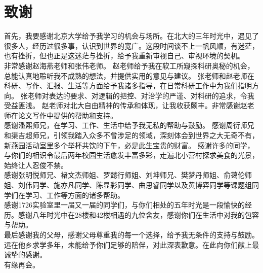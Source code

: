 
\chapter{致谢}
首先，我要感谢北京大学给予我学习的机会与场所。在北大的三年时光中，遇见了很多人，经历过很多事，认识到世界的宽广。这段时间谈不上一帆风顺，有迷茫，也有挫折，但也正是这迷茫与挫折，给予我重新审视自己、审视环境的契机。\\
\indent 非常感谢赵海燕老师和张伟老师。
赵老师给予我在软工所窥探科研奥秘的机会，总能认真地聆听我不成熟的想法，并提供实用的意见与建议。
张老师和赵老师在科研、写作、汇报、生活等方面给予我诸多指导，在日常科研工作中为我们指明方向。
张老师对表达的要求、对逻辑的把控、对治学的严谨、对科研的追求，令我受益匪浅。
赵老师对北大自由精神的传承和体现，让我收获颇丰。非常感谢赵老师在论文写作中提供的帮助和支持。\\
\indent 感谢潘熙师兄，在学习、工作、生活中给予我无私的帮助与鼓励。
感谢周衍师兄和渠吉超师兄，引领我踏入众多不曾涉足的领域，深刻体会到世界之大无奇不有，新燕园活动室里多个举杯共饮的下午，必是此生宝贵的财富。
感谢许多的同学，与你们的相识令最后两年校园生活愈发丰富多彩，走遍北小营村探求美食的光景，始终让人忍俊不禁。\\
\indent 感谢张明悦师兄、褚文杰师姐、罗懿行师姐、刘坤师兄、樊梦丹师姐、俞蔼伦师姐、刘伟同学、施亦凡同学、陈显彩同学、曲思睿同学以及黄博弈同学等课题组同学们在学习、工作等方面的诸多帮助。\\
\indent 感谢1726实验室里一届又一届的同学们，与你们相处的五年时光是一段愉快的经历。感谢八年时光中在28楼和42楼相遇的九位舍友，感谢你们在生活中对我的包容与帮助。\\
\indent 最后感谢我的父母，感谢父母尊重我的每一个选择，给予我无条件的支持与鼓励。远在他乡求学多年，未能给予你们足够的陪伴，对此深表歉意。在此向你们献上最诚挚的感谢。\\
\indent 有缘再会。

